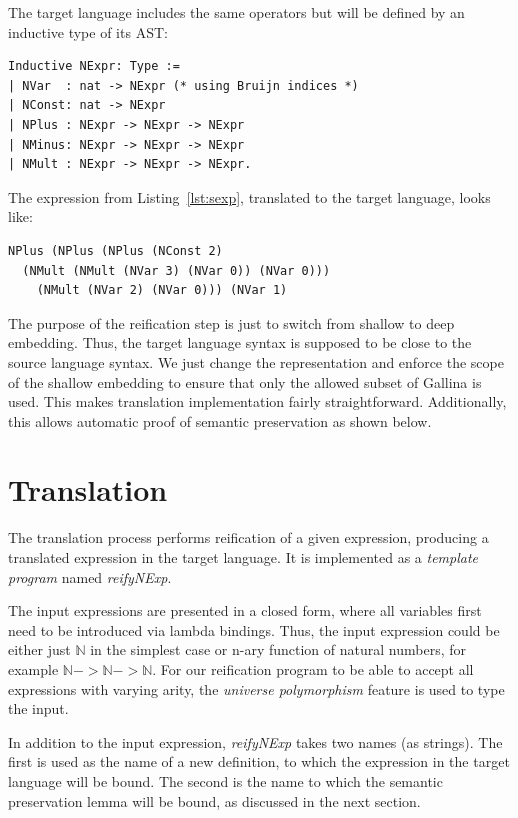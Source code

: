 \documentclass[sigplan]{acmart}\settopmatter{printfolios=true,printccs=false,printacmref=false}
\newcommand{\N}{\mathbb{N}}
\begin{document}
The target language includes the same operators but will be defined by
an inductive type of its AST:

\begin{lstlisting}[language=Coq, mathescape=true,
  caption=Target language type,
  basicstyle=\footnotesize]
Inductive NExpr: Type :=
| NVar  : nat -> NExpr (* using Bruijn indices *)
| NConst: nat -> NExpr
| NPlus : NExpr -> NExpr -> NExpr
| NMinus: NExpr -> NExpr -> NExpr
| NMult : NExpr -> NExpr -> NExpr.
\end{lstlisting}

The expression from Listing~\ref{lst:sexp}, translated to the target
language, looks like:

\begin{lstlisting}[language=Coq, mathescape=true,
  basicstyle=\footnotesize,
  caption=Expression in target language, label=lst:texp]
NPlus (NPlus (NPlus (NConst 2)
  (NMult (NMult (NVar 3) (NVar 0)) (NVar 0)))
    (NMult (NVar 2) (NVar 0))) (NVar 1)
\end{lstlisting}

The purpose of the reification step is just to switch from shallow to
deep embedding. Thus, the target language syntax is supposed to be
close to the source language syntax. We just change the representation and
enforce the scope of the shallow embedding to ensure that only the
allowed subset of Gallina is used. This makes translation implementation fairly
straightforward. Additionally, this allows automatic proof of semantic
preservation as shown below.

\section{Translation}

The translation process performs reification of a given expression,
producing a translated expression in the target language. It is implemented as a
\textit{template program} named \emph{reifyNExp}.

The input expressions are presented in a closed form, where all
variables first need to be introduced via lambda bindings. Thus, the
input expression could be either just $\N$ in the simplest case or
n-ary function of natural numbers, for example $\N -> \N -> \N$. For
our reification program to be able to accept all expressions with
varying arity, the \textit{universe polymorphism}
feature \cite{sozeau2014universe} is used to type the input.

In addition to the input expression, \emph{reifyNExp} takes two names
(as strings). The first is used as the name of a new
definition, to which the expression in the target language will be
bound. The second is the name to which the semantic preservation lemma will be bound, as
discussed in the next section.
\end{document}
